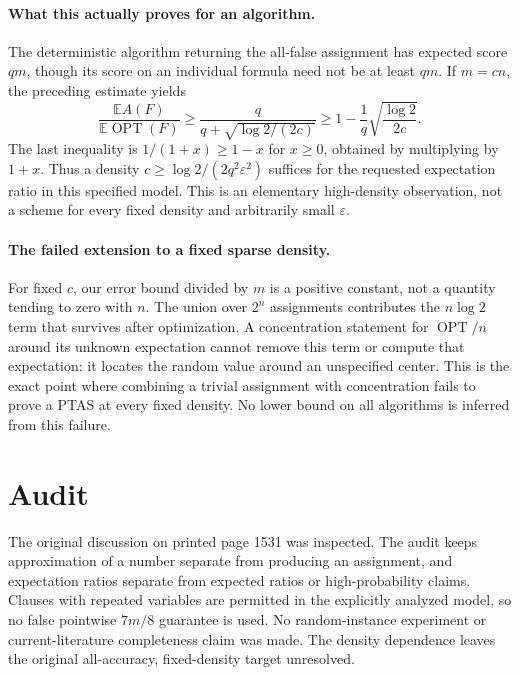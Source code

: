 \documentclass[11pt]{article}
\begin{document}
\paragraph{What this actually proves for an algorithm.}
The deterministic algorithm returning the all-false assignment has
expected score $qm$, though its score on an individual formula need
not be at least $qm$. If $m=cn$, the preceding estimate yields
\[
\frac{\mathbb EA(F)}{\mathbb E\operatorname{OPT}(F)}
\ge\frac{q}{q+\sqrt{\log2/(2c)}}
\ge1-\frac{1}{q}\sqrt{\frac{\log2}{2c}}.
\]
The last inequality is $1/(1+x)\ge1-x$ for $x\ge0$,
obtained by multiplying by $1+x$. Thus a density
$c\ge\log2/(2q^2\varepsilon^2)$ suffices for the requested
expectation ratio in this specified model. This is an elementary
high-density observation, not a scheme for every fixed density and
arbitrarily small $\varepsilon$.

\paragraph{The failed extension to a fixed sparse density.}
For fixed $c$, our error bound divided by $m$ is a positive constant,
not a quantity tending to zero with $n$. The union over $2^n$
assignments contributes the $n\log2$ term that survives after
optimization. A concentration statement for $\operatorname{OPT}/n$
around its unknown expectation cannot remove this term or compute
that expectation: it locates the random value around an unspecified
center. This is the exact point where combining a trivial assignment
with concentration fails to prove a PTAS at every fixed density.
No lower bound on all algorithms is inferred from this failure.

\section{Audit}
The original discussion on printed page 1531 was inspected. The audit
keeps approximation of a number separate from producing an assignment,
and expectation ratios separate from expected ratios or high-probability
claims. Clauses with repeated variables are permitted in the explicitly
analyzed model, so no false pointwise $7m/8$ guarantee is used.
No random-instance experiment or current-literature completeness claim
was made. The density dependence leaves the original all-accuracy,
fixed-density target unresolved.
\end{document}
